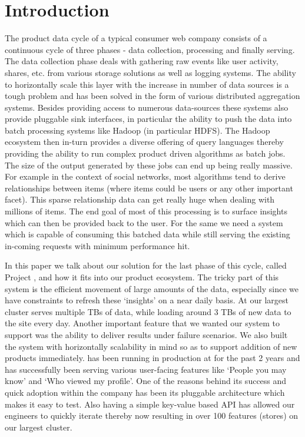 \section{Introduction}
\label{sec:introduction}
The product data cycle of a typical consumer web company consists of a continuous cycle of three phases - data collection, processing and finally serving. The data collection phase deals with gathering raw events like user activity, shares, etc. from various storage solutions as well as logging systems. The ability to horizontally scale this layer with the increase in number of data sources is a tough problem and has been solved in the form of various distributed aggregation systems. Besides providing access to numerous data-sources these systems also provide pluggable sink interfaces, in particular the ability to push the data into batch processing systems like Hadoop (in particular HDFS)\cite{hadoop}. The Hadoop ecosystem then in-turn provides a diverse offering of query languages thereby providing the ability to run complex product driven algorithms as batch jobs. The size of the output generated by these jobs can end up being really massive. For example in the context of social networks, most algorithms tend to derive relationships between items (where items could be users or any other important facet). This sparse relationship data can get really huge when dealing with millions of items. The end goal of most of this processing is to surface insights which can then be provided back to the user. For the same we need a system which is capable of consuming this batched data while still serving the existing in-coming requests with minimum performance hit. 

In this paper we talk about our solution for the last phase of this cycle, called Project \projectname{}, and how it fits into our product ecosystem. The tricky part of this system is the efficient movement of large amounts of the data, especially since we have constraints to refresh these `insights' on a near daily basis. At \linkedin{} our largest cluster serves multiple TBs of data, while loading around 3 TBs of new data to the site every day. Another important feature that we wanted our system to support was the ability to deliver results under failure scenarios. We also built the system with horizontally scalability in mind so as to support addition of new products immediately. \projectname{} has been running in production at \linkedin{} for the past 2 years and has successfully been serving various user-facing features like `People you may know' and `Who viewed my profile'. One of the reasons behind its success and quick adoption within the company has been its pluggable architecture which makes it easy to test. Also having a simple key-value based API has allowed our engineers to quickly iterate thereby now resulting in over 100 features (stores) on our largest cluster.

